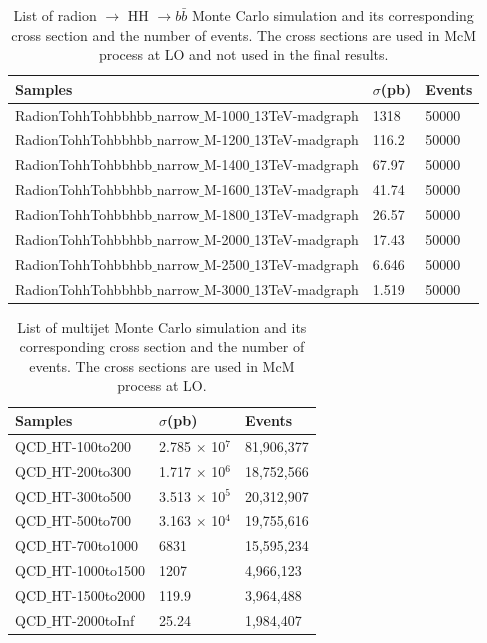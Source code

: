\begin{table}[h!]
  \begin{center}
    \begin{tabular}{l|l|l}
    Samples & $\sigma$(pb) & Events \\
    \hline
    RadionTohhTohbbhbb$\_$narrow$\_$M-1000$\_$13TeV-madgraph & 1318 & 50000 \\
    RadionTohhTohbbhbb$\_$narrow$\_$M-1200$\_$13TeV-madgraph & 116.2 & 50000 \\
    RadionTohhTohbbhbb$\_$narrow$\_$M-1400$\_$13TeV-madgraph & 67.97 & 50000 \\
    RadionTohhTohbbhbb$\_$narrow$\_$M-1600$\_$13TeV-madgraph & 41.74 & 50000 \\
    RadionTohhTohbbhbb$\_$narrow$\_$M-1800$\_$13TeV-madgraph & 26.57 & 50000 \\
    RadionTohhTohbbhbb$\_$narrow$\_$M-2000$\_$13TeV-madgraph & 17.43 & 50000 \\
    RadionTohhTohbbhbb$\_$narrow$\_$M-2500$\_$13TeV-madgraph & 6.646 & 50000 \\
    RadionTohhTohbbhbb$\_$narrow$\_$M-3000$\_$13TeV-madgraph & 1.519 & 50000 \\
   
    \end{tabular}
  \end{center}
  \caption{List of radion $\rightarrow$ HH $\rightarrow b\bar{b} $ Monte Carlo simulation and its corresponding cross section and the number of events. The cross sections are used in McM process at LO and not used in the final results.}
\end{table} 

\begin{table}[h!]
  \begin{center}
    \begin{tabular}{l|l|l}
    Samples & $\sigma$(pb) & Events \\
    \hline
    QCD$\_$HT-100to200  & 2.785 $\times$ 10$^7$ & 81,906,377 \\
    QCD$\_$HT-200to300  & 1.717 $\times$ 10$^6$ & 18,752,566 \\
    QCD$\_$HT-300to500  & 3.513 $\times$ 10$^5$ & 20,312,907 \\
    QCD$\_$HT-500to700  & 3.163 $\times$ 10$^4$ & 19,755,616 \\
    QCD$\_$HT-700to1000  & 6831 & 15,595,234 \\
    QCD$\_$HT-1000to1500  & 1207 & 4,966,123 \\
    QCD$\_$HT-1500to2000  & 119.9 & 3,964,488 \\
    QCD$\_$HT-2000toInf  & 25.24 & 1,984,407 \\

    \end{tabular}
  \end{center}

  \caption{List of multijet Monte Carlo simulation and its corresponding cross section and the number of events. The cross sections are used in McM process at LO.}
\end{table}

